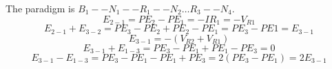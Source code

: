 \documentclass{article}
\begin{document}
	The paradigm is $B_1-- N_1 -- R_1 -- N_2 \dots R_3 -- N_4$.
	$$ E_{2-1} = PE_2 - PE_1 = -IR_1 = -V_{R1}$$
	$$ E_{2-1} + E_{3-2}  = PE_3 - PE_2 + PE_2 - PE_1 = PE_3 - PE1 = E_{3-1}$$
	$$ E_{3-1} = -(V_{R2} + V_{R1})$$
	$$ E_{3-1} + E_{1-3} = PE_3 - PE_1 + PE_1 - PE_3 = 0$$
	$$ E_{3-1} - E_{1-3} = PE_3 - PE_1 - PE_1 + PE_3 = 2(PE_3 - PE_1)=2E_{3-1}$$
\end{document}
